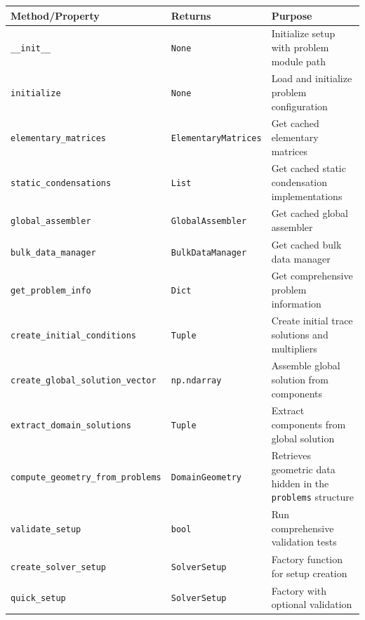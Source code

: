 \begin{longtable}{|p{6cm}|p{4cm}|p{4cm}|}
\hline
\textbf{Method/Property} & \textbf{Returns} & \textbf{Purpose} \\
\hline
\endhead

\texttt{\_\_init\_\_} & \texttt{None} & Initialize setup with problem module path \\
\hline

\texttt{initialize} & \texttt{None} & Load and initialize problem configuration \\
\hline

\texttt{elementary\_matrices} & \texttt{ElementaryMatrices} & Get cached elementary matrices \\
\hline

\texttt{static\_condensations} & \texttt{List} & Get cached static condensation implementations \\
\hline

\texttt{global\_assembler} & \texttt{GlobalAssembler} & Get cached global assembler \\
\hline

\texttt{bulk\_data\_manager} & \texttt{BulkDataManager} & Get cached bulk data manager \\
\hline

\texttt{get\_problem\_info} & \texttt{Dict} & Get comprehensive problem information \\
\hline

\texttt{create\_initial\_conditions} & \texttt{Tuple} & Create initial trace solutions and multipliers \\
\hline

\texttt{create\_global\_solution\_vector} & \texttt{np.ndarray} & Assemble global solution from components \\
\hline

\texttt{extract\_domain\_solutions} & \texttt{Tuple} & Extract components from global solution \\
\hline

\texttt{compute\_geometry\_from\_problems} & \texttt{DomainGeometry} & Retrieves geometric data hidden in the {\tt problems} structure \\
\hline

\texttt{validate\_setup} & \texttt{bool} & Run comprehensive validation tests \\
\hline

\texttt{create\_solver\_setup} & \texttt{SolverSetup} & Factory function for setup creation \\
\hline

\texttt{quick\_setup} & \texttt{SolverSetup} & Factory with optional validation \\
\hline

\end{longtable}

